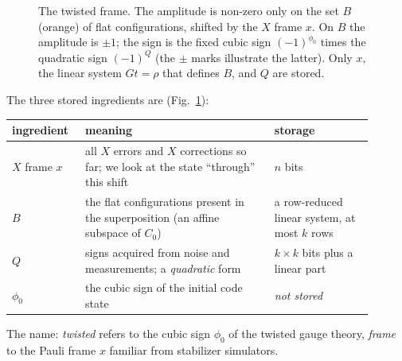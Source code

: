 \documentclass[11pt,a4paper]{article}
\begin{document}
\begin{figure}[t]
\centering
{}
\caption{The twisted frame. The amplitude is non-zero only on the set $B$ (orange) of flat configurations, shifted by the $X$ frame $x$. On $B$ the amplitude is $\pm1$; the sign is the fixed cubic sign $(-1)^{\phi_0}$ times the quadratic sign $(-1)^Q$ (the $\pm$ marks illustrate the latter). Only $x$, the linear system $Gt=\rho$ that defines $B$, and $Q$ are stored.}
\label{fig:rep}
\end{figure}

The three stored ingredients are (Fig.~\ref{fig:rep}):
\begin{center}
\begin{tabular}{>{\raggedright}p{0.17\linewidth}>{\raggedright}p{0.48\linewidth}p{0.25\linewidth}}
\toprule
ingredient & meaning & storage \\
\midrule
$X$ frame $x$ & all $X$ errors and $X$ corrections so far; we look at the state ``through'' this shift & $n$ bits \\
$B$ & the flat configurations present in the superposition (an affine subspace of $C_0$) & a row-reduced linear system, at most $k$ rows \\
$Q$ & signs acquired from noise and measurements; a \emph{quadratic} form & $k\times k$ bits plus a linear part \\
$\phi_0$ & the cubic sign of the initial code state & \emph{not stored} \\
\bottomrule
\end{tabular}
\end{center}
The name: \emph{twisted} refers to the cubic sign $\phi_0$ of the twisted gauge theory, \emph{frame} to the Pauli frame $x$ familiar from stabilizer simulators.
\end{document}

